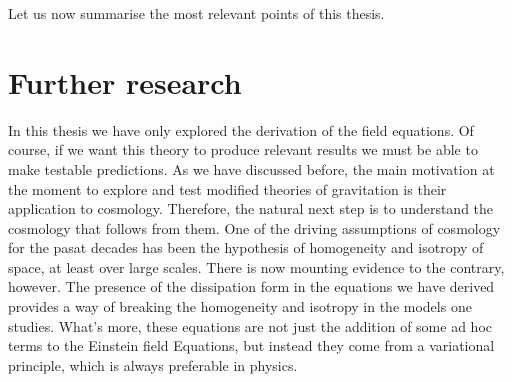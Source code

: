 \documentclass[../main.tex]{subfiles}
\begin{document}
Let us now summarise the most relevant points of this thesis. 

\section{Further research}
In this thesis we have only explored the derivation of the field equations. Of course, if
we want this theory to produce relevant results we must be able to make testable
predictions. As we have discussed before, the main motivation at the moment to explore and
test modified theories of gravitation is their application to cosmology. Therefore, the
natural next step is to understand the cosmology that follows from them. One of the
driving assumptions of cosmology for the pasat decades has been the hypothesis of
homogeneity and isotropy of space, at least over large scales. There is now mounting
evidence to the contrary, however. The presence of the dissipation form in the equations
we have derived provides a way of breaking the homogeneity and isotropy in the models one
studies. What's more, these equations are not just the addition of some ad hoc terms to
the Einstein field Equations, but instead they come from a variational principle, which is
always preferable in physics. 
\end{document}
